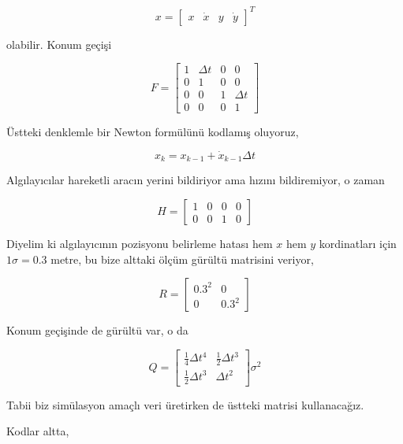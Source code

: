 \documentclass[12pt,fleqn]{article}\usepackage{../../common}
\begin{document}
$$ x=\left[\begin{array}{cccc} x&\dot{x}&y&\dot{y} \end{array}\right]^T $$

olabilir. Konum geçişi 

$$ F = 
\left[\begin{array}{rrrr}
1 & \Delta t & 0 & 0 \\
0 & 1 & 0 & 0 \\
0 & 0 & 1 & \Delta t \\
0 & 0 & 0 & 1
\end{array}\right]
$$

Üstteki denklemle bir Newton formülünü kodlamış oluyoruz, 

$$ x_k = x_{k-1} + \dot{x}_{k-1}\Delta t $$

Algılayıcılar hareketli aracın yerini bildiriyor ama hızını bildiremiyor, o
zaman 

$$ H = \left[\begin{array}{rrrr}
1 & 0 & 0 & 0 \\
0 & 0 & 1 & 0 
\end{array}\right]$$

Diyelim ki algılayıcının pozisyonu belirleme hatası hem $x$ hem $y$
kordinatları için $1\sigma = 0.3$ metre, bu bize alttaki ölçüm gürültü
matrisini veriyor, 

$$ R = \left[\begin{array}{cc}
0.3^2  & 0 \\ 0 & 0.3^2
\end{array}\right]$$

Konum geçişinde  de gürültü var, o da 

$$ Q = \left[\begin{array}{cc}
\frac{1}{4} \Delta t^4 & \frac{1}{2} \Delta t^3 \\
\frac{1}{2} \Delta t^3 & \Delta t^2 
\end{array}\right] \sigma^2  $$

Tabii biz simülasyon amaçlı veri üretirken de üstteki matrisi
kullanacağız. 

Kodlar altta,

\inputminted[fontsize=\footnotesize]{python}{filter.py}
\end{document}
